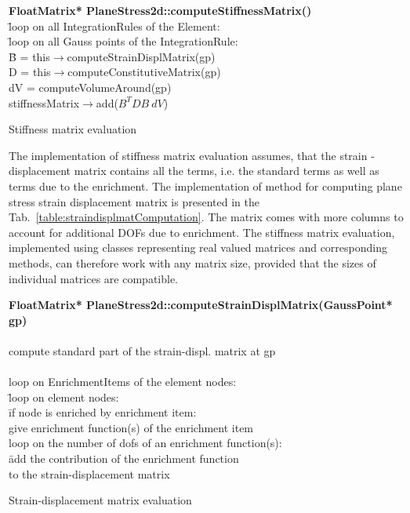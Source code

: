 \documentclass[a4paper]{article}
\begin{document}
\begin{table}[ht]
\makebox[\textwidth]{\hrulefill}
\begin{tabbing}
{\bf FloatMatrix* PlaneStress2d::computeStiffnessMatrix()}\\
\=loop on all IntegrationRules of the Element:\\
\>\hspace{2em}\=loop on all Gauss points of the IntegrationRule:\\
\>\>\hspace{2em}\=B = this$\to$computeStrainDisplMatrix(gp)\\
\>\>\>D = this$\to$computeConstitutiveMatrix(gp)\\
\>\>\>dV = computeVolumeAround(gp)\\
\>\>\>stiffnessMatrix$\to$add($B^TDB\ dV$)
\end{tabbing}
\makebox[\textwidth]{\hrulefill}
\caption{Stiffness matrix evaluation}
\label{table:stiffnessComputation}
\end{table}

The implementation of stiffness matrix evaluation assumes, that the strain - displacement matrix contains all the terms, i.e. the standard terms as well as terms due to the enrichment. The implementation of method for computing plane stress strain displacement matrix is presented in the Tab.~\ref{table:straindisplmatComputation}. The matrix comes with more columns to account for additional DOFs due to enrichment. The stiffness matrix evaluation, implemented using classes representing real valued matrices and corresponding methods, can therefore work with any matrix size, provided that the sizes of individual matrices are compatible. 

\begin{table}[ht]
\makebox[\textwidth]{\hrulefill}
\begin{tabbing}
{\bf FloatMatrix* PlaneStress2d::computeStrainDisplMatrix(GaussPoint* gp)}\\
\=\\
\>compute standard part of the strain-displ. matrix at gp\\
\\
\>loop on EnrichmentItems of the element nodes:\\
\>\hspace{2em}\=loop on element nodes:\\
\>\>\hspace{2em}\=if node is enriched by  enrichment item:\\
\>\>\>give enrichment function(s) of the enrichment item\\
\>\>\>loop on the number of dofs of an enrichment function(s):\\
\>\>\>\hspace{2em}\=add the contribution of the enrichment function\\
\>\>\>\>to the strain-displacement matrix
\end{tabbing}
\makebox[\textwidth]{\hrulefill}
\caption{Strain-displacement matrix evaluation}
\label{table:straindisplmatComputation}
\end{table}
\end{document}
